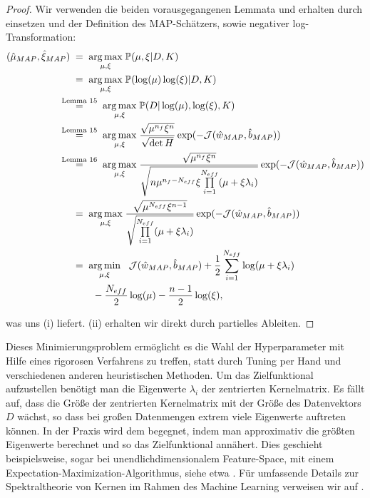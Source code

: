 \begin{proof}
Wir verwenden die beiden vorausgegangenen Lemmata und erhalten durch einsetzen und der Definition des MAP-Schätzers, sowie negativer log-Transformation:
\begin{align*}
	(\hat{\mu}_{MAP}, \hat{\xi}_{MAP}) 
	&\;=\; \underset{\mu, \xi}{\arg \max}\; \mathbb{P}(\mu, \xi \vert D, K) \\
	&\;=\; \underset{\mu, \xi}{\arg \max}\; \mathbb{P}(\log(\mu) \log(\xi) \vert D, K) \\
	& \hspace{-0.5cm}\;\overset{\text{Lemma 15}}{=}\; \underset{\mu, \xi}{\arg \max}\; \mathbb{P}(D \vert \log(\mu), \log(\xi), K) \\
	&\hspace{-0.5cm}\;\overset{\text{Lemma 15}}{=}\; \underset{\mu, \xi}{\arg \max}\; \frac{\sqrt{\mu^{n_f} \xi^n}}	{\sqrt{\det H}} 				\exp(- \mathcal{J}(\hat{w}_{MAP},\hat{b}_{MAP})) \\
	&\hspace{-0.5cm}\;\overset{\text{Lemma 16}}{=}\; \underset{\mu, \xi}{\arg \max}\; \frac{\sqrt{\mu^{n_f} \xi^n}}	{\sqrt{n \mu^{n_f - 			N_{eff}} \xi \underset{i=1}{\overset{N_{eff}}{\prod}}(\mu + 			\xi 				\lambda_i)}} \exp(- \mathcal{J}(\hat{w}_{MAP},\hat{b}_{MAP})) \\
	&\;=\; \underset{\mu, \xi}{\arg \max}\; \frac{\sqrt{\mu^{N_{eff}} \xi^{n-1}}}	{\sqrt{ 				\underset{i=1}{\overset{N_{eff}}{\prod}}(\mu + 	\xi	\lambda_i)}} \exp(- 					\mathcal{J}(\hat{w}_{MAP},\hat{b}_{MAP})) \\
	&\;=\; \underset{\mu, \xi}{\arg \min}\;  \hspace{0.2cm} \mathcal{J}(\hat{w}_{MAP}, 			   	 	\hat{b}_{MAP}) + \frac{1}{2}\sum_{i=1}^{N_{eff}}\log(\mu + \xi \lambda_i)\\
	 & \hspace{0.8cm}- \frac{N_{eff}}{2}\log(\mu) - \frac{n -1 }{2}\log(\xi),
\end{align*}

was uns (i) liefert. (ii) erhalten wir direkt durch partielles Ableiten.

\end{proof}

Dieses Minimierungsproblem ermöglicht es die Wahl der Hyperparameter mit Hilfe eines rigorosen Verfahrens zu treffen, statt durch Tuning per Hand und verschiedenen anderen heuristischen Methoden. Um das Zielfunktional aufzustellen benötigt man die Eigenwerte $\lambda_i$ der zentrierten Kernelmatrix. Es fällt auf, dass die Größe der zentrierten Kernelmatrix mit der Größe des Datenvektors $D$ wächst, so dass bei großen Datenmengen extrem viele Eigenwerte auftreten können. In der Praxis wird dem begegnet, indem man approximativ die größten Eigenwerte berechnet und so das Zielfunktional annähert. Dies geschieht beispielsweise, sogar bei unendlichdimensionalem Feature-Space, mit einem Expectation-Maximization-Algorithmus, siehe etwa \cite{Kernel_PCA}. Für umfassende Details zur Spektraltheorie von Kernen im Rahmen des Machine Learning verweisen wir auf \cite{spectral_kernel}.


